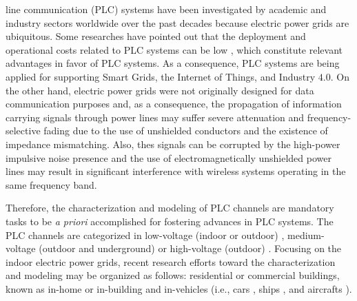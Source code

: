 \documentclass[journal]{IEEEtran}
\begin{document}
 line communication (PLC) systems have been investigated by academic and industry sectors worldwide over the past decades because %
electric power grids are ubiquitous. Some researches have pointed out that the deployment and operational costs related to \ac{PLC} systems can be low \cite{Hrasnica:PLC_design, Dib}, which constitute relevant advantages in favor of \ac{PLC} systems. As a consequence, \ac{PLC} systems are being applied for supporting Smart Grids, the Internet of Things, and Industry $4.0$. On the other hand, electric power grids were not originally designed for data communication purposes and, as a consequence, the propagation of information carrying signals through power lines may suffer severe attenuation and frequency-selective fading due to the use of unshielded conductors and the existence of impedance mismatching. Also, thes signals can be corrupted by the high-power impulsive noise presence and the use of electromagnetically unshielded power lines may result in significant interference with wireless systems operating in the same frequency band. %

Therefore, the characterization and modeling of \ac{PLC} channels are mandatory tasks to be \textit{a priori} accomplished for fostering advances in \ac{PLC} systems. The \ac{PLC} channels are categorized in low-voltage (indoor or outdoor) \cite{Zhai:low}, medium-voltage (outdoor and underground) \cite{Lazaropoulos} or high-voltage (outdoor) \cite{Zajc}. Focusing on the indoor electric power grids, recent research efforts toward the characterization and modeling may be organized as follows: residential or commercial buildings, known as in-home or in-building \cite{Amirshahi:PLC,Tlich:Indoor} and in-vehicles (i.e., cars \cite{Vallejo:Vehicle_PLC}, ships \cite{Barmada:Ships_PLC}, and aircrafts \cite{Jones:Aircraft_PLC,Andrey2016}). %
\end{document}
